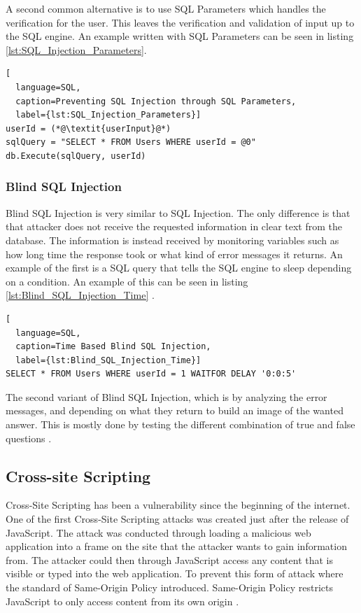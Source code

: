 A second common alternative is to use SQL Parameters which handles the verification for the user. This leaves the verification and validation of input up to the SQL engine. An example written with SQL Parameters can be seen in listing \ref{lst:SQL_Injection_Parameters}.

\hfill
\begin{lstlisting}[
  language=SQL,
  caption=Preventing SQL Injection through SQL Parameters,
  label={lst:SQL_Injection_Parameters}]
userId = (*@\textit{userInput}@*)
sqlQuery = "SELECT * FROM Users WHERE userId = @0"
db.Execute(sqlQuery, userId)
\end{lstlisting}



\subsubsection{Blind SQL Injection}
Blind SQL Injection is very similar to SQL Injection. The only difference is that that attacker does not receive the requested information in clear text from the database. The information is instead received by monitoring variables such as how long time the response took or what kind of error messages it returns. An example of the first is a SQL query that tells the SQL engine to sleep depending on a condition. An example of this can be seen in listing \ref{lst:Blind_SQL_Injection_Time} \parencite{JustinClarke-Salt2009SIAa, Secure_Web}.

\hfill
\begin{lstlisting}[
  language=SQL,
  caption=Time Based Blind SQL Injection,
  label={lst:Blind_SQL_Injection_Time}]
SELECT * FROM Users WHERE userId = 1 WAITFOR DELAY '0:0:5'
\end{lstlisting}
\hfill

The second variant of Blind SQL Injection, which is by analyzing the error messages, and depending on what they return to build an image of the wanted answer. This is mostly done by testing the different combination of true and false questions \parencite{JustinClarke-Salt2009SIAa, Secure_Web}.



\subsection{Cross-site Scripting}
Cross-Site Scripting has been a vulnerability since the beginning of the internet. One of the first Cross-Site Scripting attacks was created just after the release of JavaScript. The attack was conducted through loading a malicious web application into a frame on the site that the attacker wants to gain information from. The attacker could then through JavaScript access any content that is visible or typed into the web application. To prevent this form of attack where the standard of Same-Origin Policy introduced. Same-Origin Policy restricts JavaScript to only access content from its own origin \parencite{FogieSeth2007Xacs, w3csop}.

